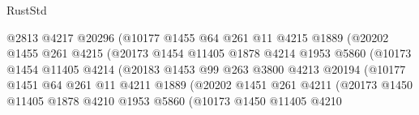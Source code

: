 \begin{lexlean}{RustStd}
\begin{coremodule}
                                  @2813
                                  @4217
                                  @20296
                                  (@10177
                                    @1455
                                    @64
                                    @261
                                    @11
                                    @4215
                                    @1889
                                    (@20202
                                      @1455
                                      @261
                                      @4215
                                      (@20173
                                        @1454
                                        @11405
                                        @1878
                                        @4214
                                        @1953
                                        @5860
                                        (@10173
                                          @1454
                                          @11405
                                          @4214
                                          (@20183
                                            @1453
                                            @99
                                            @263
                                            @3800
                                            @4213
                                            @20194
                                            (@10177
                                              @1451
                                              @64
                                              @261
                                              @11
                                              @4211
                                              @1889
                                              (@20202
                                                @1451
                                                @261
                                                @4211
                                                (@20173
                                                  @1450
                                                  @11405
                                                  @1878
                                                  @4210
                                                  @1953
                                                  @5860
                                                  (@10173
                                                    @1450
                                                    @11405
                                                    @4210

\end{coremodule}
\end{lexlean}
